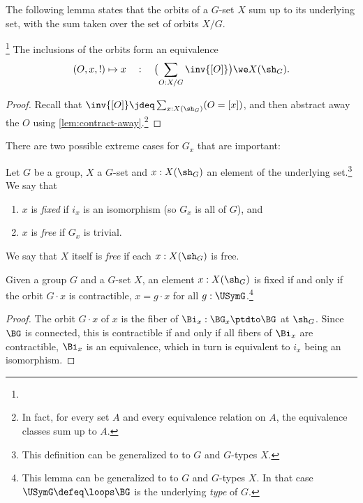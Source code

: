 The following lemma states that the orbits of a $G$-set $X$
sum up to its underlying set, with the sum taken over the set
of orbits $X/G$.

\begin{lemma}\footnote{}
  \label{lem:splitting into orbits}
  The inclusions of the orbits form an equivalence
\[
  (O,x,!)\mapsto x \quad:\quad
  \bigl(\sum_{O:X/G} \inv{[O]} \bigr) \we X(\sh_G).
\]
\end{lemma}
\begin{proof}
Recall that $\inv{[O]}\jdeq \sum_{x:X(\sh_G)}(O=[x])$, 
and then abstract
away the $O$ using \cref{lem:contract-away}.\footnote{%
In fact, for every set $A$ and every equivalence relation on $A$,
the equivalence classes sum up to $A$.}
\end{proof}

There are two possible extreme cases for $G_x$ that are important:
\begin{definition}\label{def:fixed-free}
  Let $G$ be a group, $X$ a $G$-set and $x:X(\sh_G)$ an element of the underlying set.\footnote{%
  This definition can be generalized to to \inftygps $G$ and $G$-types $X$.}
  We say that
  \begin{enumerate}
  \item $x$ is \emph{fixed}
    if $i_x$ is an isomorphism (so $G_x$ is all of $G$), and
  \item $x$ is \emph{free}
    if $G_x$ is trivial.
  \end{enumerate}
  We say that $X$ itself is \emph{free} if each $x:X(\sh_G)$ is free.
\end{definition}

\begin{lemma}\label{lem:fixed-char}
  Given a group $G$ and a $G$-set $X$, an element $x:X(\sh_G)$ is
 fixed if and only if the orbit $G\cdot x$ is contractible,
  \ie $x = g\cdot x$ for all $g:\USymG$.\footnote{%
  This lemma can be generalized to to \inftygps $G$ and $G$-types $X$.
  In that case $\USymG\defeq\loops\BG$ is the underlying \emph{type} of $G$.}
\end{lemma}
\begin{proof}
  The orbit $G\cdot x$ of $x$ is the fiber of $\Bi_x : \BG_x \ptdto \BG$
  at $\sh_G$. Since $\BG$ is connected,
  this is contractible if and only if all fibers of $\Bi_x$ are contractible,
  \ie $\Bi_x$ is an equivalence, which in turn is equivalent to $i_x$
  being an isomorphism.
\end{proof}

